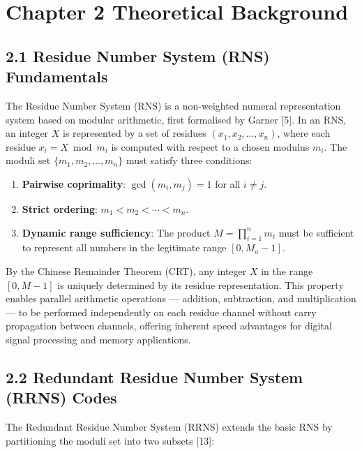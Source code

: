 \documentclass[
  english,
  12pt,
]{report}
\providecommand{\tightlist}{%
  \setlength{\itemsep}{0pt}\setlength{\parskip}{0pt}}
\begin{document}
\chapter{Chapter 2 Theoretical
Background}\label{chapter-2-theoretical-background}

\section{2.1 Residue Number System (RNS)
Fundamentals}\label{residue-number-system-rns-fundamentals}

The Residue Number System (RNS) is a non-weighted numeral representation
system based on modular arithmetic, first formalised by Garner {[}5{]}.
In an RNS, an integer \(X\) is represented by a set of residues
\((x_1, x_2, \ldots, x_n)\), where each residue \(x_i = X \bmod m_i\) is
computed with respect to a chosen modulus \(m_i\). The moduli set
\(\{m_1, m_2, \ldots, m_n\}\) must satisfy three conditions:

\begin{enumerate}
\def\labelenumi{\arabic{enumi}.}
\tightlist
\item
  \textbf{Pairwise coprimality}: \(\gcd(m_i, m_j) = 1\) for all
  \(i \neq j\).
\item
  \textbf{Strict ordering}: \(m_1 < m_2 < \cdots < m_n\).
\item
  \textbf{Dynamic range sufficiency}: The product
  \(M = \prod_{i=1}^{n} m_i\) must be sufficient to represent all
  numbers in the legitimate range \([0, M_a - 1]\).
\end{enumerate}

By the Chinese Remainder Theorem (CRT), any integer \(X\) in the range
\([0, M-1]\) is uniquely determined by its residue representation. This
property enables parallel arithmetic operations --- addition,
subtraction, and multiplication --- to be performed independently on
each residue channel without carry propagation between channels,
offering inherent speed advantages for digital signal processing and
memory applications.

\section{2.2 Redundant Residue Number System (RRNS)
Codes}\label{redundant-residue-number-system-rrns-codes}

The Redundant Residue Number System (RRNS) extends the basic RNS by
partitioning the moduli set into two subsets {[}13{]}:
\end{document}
